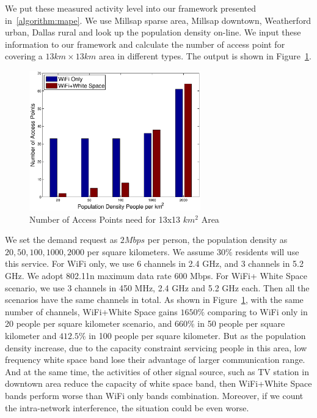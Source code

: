 We put these measured activity level into our framework presented in~\ref{algorithm:mape}. We use Millsap
sparse area, Millsap downtown, Weatherford urban, Dallas rural and look up the population density on-line.
We input these information to our framework and calculate the number of access point for covering 
a $13 km \times 13 km$ area in different types. The output is shown in Figure~\ref{fig:redensity}. 

   \begin{figure}
   \centering
   \includegraphics[width=74mm]{figures/redensity}
   \vspace{-0.1in}
   \caption{Number of Access Points need for 13x13 $km^2$ Area}                                                                 
   \label{fig:redensity}
   \end{figure}

We set the demand request as $2Mbps$ per person, the population
density as $20,50,100,1000,2000$ per square kilometers. We assume $30\%$ residents will use this
service. For WiFi only, we use 6 channels in 2.4 GHz, and 3 channels in 5.2 GHz. 
We adopt 802.11n maximum data rate 600 Mbps. For WiFi+ White Space
scenario, we use 3 channels in 450 MHz, 2.4 GHz and 5.2 GHz each. Then all the scenarios have the 
same channels in total. As shown in Figure~\ref{fig:redensity},
with the same number of channels, WiFi+White Space gains $1650\%$ comparing to WiFi only in 20 people 
per square kilometer scenario, and $660\%$ in 50 people per square kilometer and $412.5\%$ in 100 people
per square kilometer. But as the population density increase, due to the capacity constraint servicing
people in this area, low frequency white space band lose their advantage of larger communication range. 
And at the same time, the activities of other signal source, such as TV station in downtown area reduce
the capacity of white space band, then WiFi+White Space bands perform worse than WiFi only bands combination.
Moreover, if we count the intra-network interference, the situation could be even worse.


